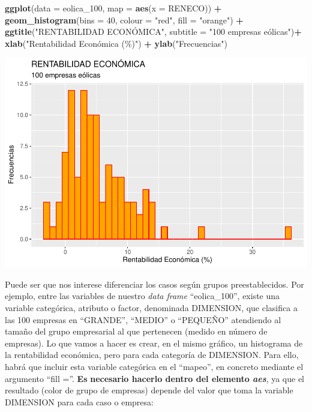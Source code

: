 \documentclass[
]{book}
\newenvironment{Shaded}{\begin{snugshade}}{\end{snugshade}}
\newcommand{\AttributeTok}[1]{\textcolor[rgb]{0.13,0.29,0.53}{#1}}
\newcommand{\DecValTok}[1]{\textcolor[rgb]{0.00,0.00,0.81}{#1}}
\newcommand{\FunctionTok}[1]{\textcolor[rgb]{0.13,0.29,0.53}{\textbf{#1}}}
\newcommand{\NormalTok}[1]{#1}
\newcommand{\SpecialCharTok}[1]{\textcolor[rgb]{0.81,0.36,0.00}{\textbf{#1}}}
\newcommand{\StringTok}[1]{\textcolor[rgb]{0.31,0.60,0.02}{#1}}
\let\Oldincludegraphics\includegraphics
\renewcommand{\includegraphics}[2][]{%
  \Oldincludegraphics[#1]{#2}%
}
\begin{document}
\begin{Shaded}
\begin{Highlighting}[]
\FunctionTok{ggplot}\NormalTok{(}\AttributeTok{data =}\NormalTok{ eolica\_100, }\AttributeTok{map =} \FunctionTok{aes}\NormalTok{(}\AttributeTok{x =}\NormalTok{ RENECO)) }\SpecialCharTok{+}
  \FunctionTok{geom\_histogram}\NormalTok{(}\AttributeTok{bins =} \DecValTok{40}\NormalTok{, }\AttributeTok{colour =} \StringTok{"red"}\NormalTok{, }\AttributeTok{fill =} \StringTok{"orange"}\NormalTok{) }\SpecialCharTok{+}
  \FunctionTok{ggtitle}\NormalTok{(}\StringTok{"RENTABILIDAD ECONÓMICA"}\NormalTok{, }\AttributeTok{subtitle =} \StringTok{"100 empresas eólicas"}\NormalTok{)}\SpecialCharTok{+}
  \FunctionTok{xlab}\NormalTok{(}\StringTok{"Rentabilidad Económica (\%)"}\NormalTok{) }\SpecialCharTok{+}
  \FunctionTok{ylab}\NormalTok{(}\StringTok{"Frecuencias"}\NormalTok{)}
\end{Highlighting}
\end{Shaded}

\includegraphics{_main_files/figure-latex/unnamed-chunk-109-1.pdf}

Puede ser que nos interese diferenciar los casos según grupos preestablecidos. Por ejemplo, entre las variables de nuestro \emph{data frame} ``eolica\_100'', existe una variable categórica, atributo o factor, denominada DIMENSION, que clasifica a las 100 empresas en ``GRANDE'', ``MEDIO'' o ``PEQUEÑO'' atendiendo al tamaño del grupo empresarial al que pertenecen (medido en número de empresas). Lo que vamos a hacer es crear, en el mismo gráfico, un histograma de la rentabilidad económica, pero para cada categoría de DIMENSION. Para ello, habrá que incluir esta variable categórica en el ``mapeo'', en concreto mediante el argumento ``fill =''. \textbf{Es} \textbf{necesario hacerlo dentro del elemento \emph{aes}}, ya que el resultado (color de grupo de empresas) depende del valor que toma la variable DIMENSION para cada caso o empresa:
\end{document}
